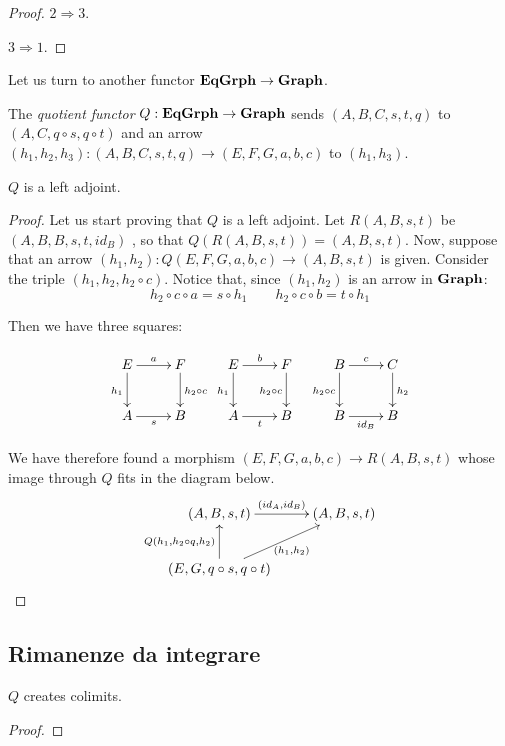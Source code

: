 {\begin{proof}
	\smallskip \noindent
	$2\Rightarrow 3.$ 
	
	\smallskip \noindent 
	$3\Rightarrow 1.$
\end{proof}

Let us turn to another functor $\mathbf{EqGrph}\to \mathbf{Graph}$.

\begin{definition}
The \emph{quotient functor} $Q:\mathbf{EqGrph}\to \mathbf{Graph} $ sends $(A, B, C, s,t, q)$ to $(A, C, q\circ s, q\circ t)$ and an arrow $(h_1, h_2, h_3) \colon (A, B, C, s,t, q)\to (E, F, G, a,b, c)$ to $(h_1, h_3)$.
\end{definition}


\begin{lemma}
	$Q$ is a left  adjoint.
\end{lemma}
\begin{proof} Let us start proving that $Q$ is a left adjoint. Let $R(A,B, s, t)$ be $(A, B, B, s,t, id_{B})$ , so that $Q(R(A,B,s,t))=(A,B,s,t)$. Now, suppose that an arrow $(h_1, h_2)\colon Q(E,F,G, a,b,c)\to (A,B, s,t)$ is given. Consider the triple $(h_1, h_2, h_2\circ c)$. Notice that, since $(h_1, h_2)$ is an arrow in $\mathbf{Graph}$:
	\[h_2\circ c\circ a= s\circ h_1 \qquad  h_2\circ c\circ b= t\circ h_1\]
	
	 Then we have three squares:	
	

\[\xymatrix{E \ar[r]^{a} \ar[d]_{h_1} & F \ar[d]^{h_2\circ c} & E \ar[r]^{b} \ar[d]_{h_1}& F \ar[d]_{h_2\circ c} & B \ar[d]_{h_2\circ c} \ar[r]^{c} & C \ar[d]^{h_2}\\A \ar[r]_{s} & B & A  \ar[r]_{t}& B & B \ar[r]_{id_B} & B}\]
	
	 We have therefore found a morphism $(E,F,G, a,b,c)\to R(A,B,s,t)$ whose image through $Q$ fits in the diagram below.
	\[\xymatrix{(A, B, s,t)\ar[r]^{(id_A, id_B)} &(A, B, s,t)\\ (E, G, q\circ s, q\circ t) \ar[ur]_{(h_1, h_2)} \ar[u]^{Q(h_1, h_2\circ q, h_2)}}\]
	
\end{proof}
}
\subsection{Rimanenze da integrare}

\begin{prop}\label{prop:colimit}
	$Q$ creates colimits.
\end{prop}
\begin{proof}
\end{proof}

